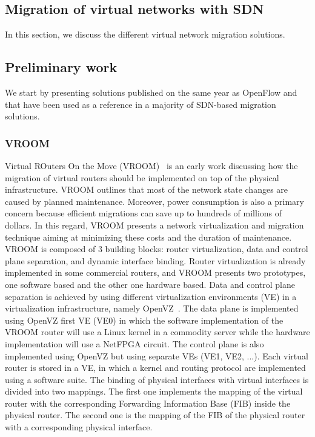 \newpage
\subsection{Migration of virtual networks with SDN}
\label{sec:sota-vnmigration}
In this section, we discuss the different virtual network migration solutions.


\subsection{Preliminary work}

We start by presenting solutions published on the same year as OpenFlow and that have been used as a reference in a majority of SDN-based migration solutions.

\subsubsection{VROOM}
Virtual ROuters On the Move (VROOM)~\cite{VROOM-Wang2008} is an early work discussing how the migration of virtual routers should be implemented on top of the physical infrastructure. 
VROOM outlines that most of the network state changes are caused by planned maintenance.
Moreover, power consumption is also a primary concern because efficient migrations can save up to hundreds of millions of dollars.
In this regard, VROOM presents a network virtualization and migration technique aiming at minimizing these costs and the duration of maintenance.
VROOM is composed of 3 building blocks: router virtualization, data and control plane separation, and dynamic interface binding.
Router virtualization is already implemented in some commercial routers, and VROOM presents two prototypes, one software based and the other one hardware based.
Data and control plane separation is achieved by using different virtualization environments (VE) in a virtualization infrastructure, namely OpenVZ~\cite{openvz}.
The data plane is implemented using OpenVZ first VE (VE0) in which the software implementation of the VROOM router will use a Linux kernel in a commodity server while the hardware implementation will use a NetFPGA circuit.
The control plane is also implemented using OpenVZ but using separate VEs (VE1, VE2, ...).
Each virtual router is stored in a VE, in which a kernel and routing protocol are implemented using a software suite.
The binding of physical interfaces with virtual interfaces is divided into two mappings.
The first one implements the mapping of the virtual router with the corresponding Forwarding Information Base (FIB) inside the physical router.
The second one is the mapping of the FIB of the physical router with a corresponding physical interface.

